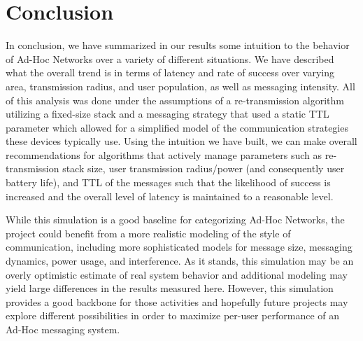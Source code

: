 \section{Conclusion}
In conclusion, we have summarized in our results some intuition to the behavior of Ad-Hoc Networks
over a variety of different situations.
We have described what the overall trend is in terms of latency and rate of success
over varying area, transmission radius, and user population, as well as messaging intensity.
All of this analysis was done under the assumptions of a re-transmission algorithm
utilizing a fixed-size stack and a messaging strategy that used a static TTL parameter
which allowed for a simplified model of the communication strategies these devices typically use.
Using the intuition we have built, we can make overall recommendations for algorithms that
actively manage parameters such as re-transmission stack size, user transmission radius/power
(and consequently user battery life), and TTL of the messages such that the likelihood of 
success is increased and the overall level of latency is maintained to a reasonable level.

While this simulation is a good baseline for categorizing Ad-Hoc Networks, the project could
benefit from a more realistic modeling of the style of communication, including more sophisticated
models for message size, messaging dynamics, power usage, and interference.
As it stands, this simulation may be an overly optimistic estimate of real system behavior and 
additional modeling may yield large differences in the results measured here.
However, this simulation provides a good backbone for those activities and hopefully future
projects may explore different possibilities in order to maximize per-user performance of
an Ad-Hoc messaging system.
